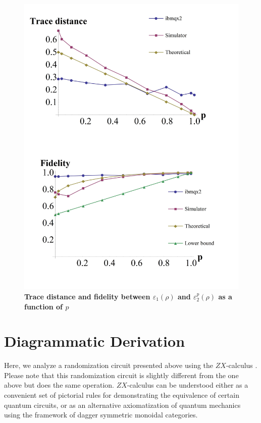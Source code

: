 \begin{figure}
\includegraphics[scale=.2]{qnoh_Fig5a.jpeg}
\caption{\textbf{Trace distance and fidelity between $\varepsilon_1(\rho)$ and $\varepsilon_2^p(\rho)$ as a function of $p$}}
\label{qnoh_Fig5a}
\end{figure}

\section{Diagrammatic Derivation}
\label{qnoh_ZX-section}

Here, we analyze a randomization circuit presented above using the $ZX$-calculus \cite{qnoh_Bob1}. Please note that this randomization circuit is slightly different from the one above but does the same operation. $ZX$-calculus can be understood either as a convenient set of pictorial rules for demonstrating the equivalence of certain quantum circuits, or as an alternative axiomatization of quantum mechanics using the framework of dagger symmetric monoidal categories.

